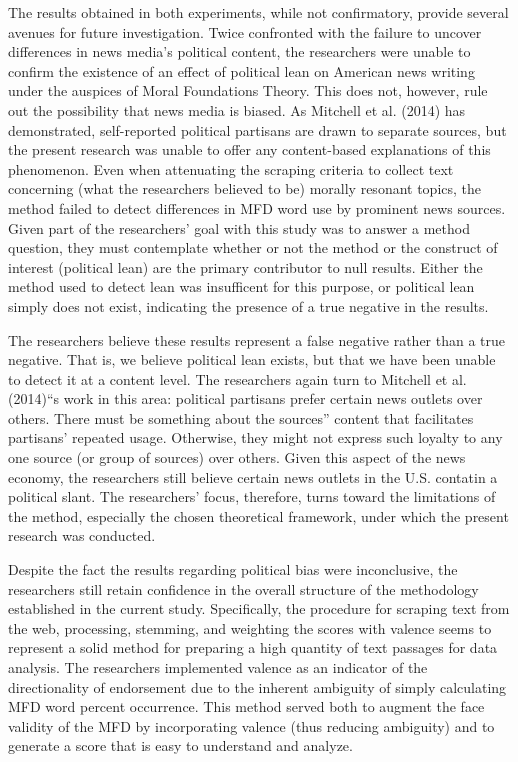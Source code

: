 \documentclass[english,,man]{apa6}
\begin{document}
The results obtained in both experiments, while not confirmatory,
provide several avenues for future investigation. Twice confronted with
the failure to uncover differences in news media's political content,
the researchers were unable to confirm the existence of an effect of
political lean on American news writing under the auspices of Moral
Foundations Theory. This does not, however, rule out the possibility
that news media is biased. As Mitchell et al. (2014) has demonstrated,
self-reported political partisans are drawn to separate sources, but the
present research was unable to offer any content-based explanations of
this phenomenon. Even when attenuating the scraping criteria to collect
text concerning (what the researchers believed to be) morally resonant
topics, the method failed to detect differences in MFD word use by
prominent news sources. Given part of the researchers' goal with this
study was to answer a method question, they must contemplate whether or
not the method or the construct of interest (political lean) are the
primary contributor to null results. Either the method used to detect
lean was insufficent for this purpose, or political lean simply does not
exist, indicating the presence of a true negative in the results.

The researchers believe these results represent a false negative rather
than a true negative. That is, we believe political lean exists, but
that we have been unable to detect it at a content level. The
researchers again turn to Mitchell et al. (2014)\enquote{s work in this
area: political partisans prefer certain news outlets over others. There
must be something about the sources} content that facilitates partisans'
repeated usage. Otherwise, they might not express such loyalty to any
one source (or group of sources) over others. Given this aspect of the
news economy, the researchers still believe certain news outlets in the
U.S. contatin a political slant. The researchers' focus, therefore,
turns toward the limitations of the method, especially the chosen
theoretical framework, under which the present research was conducted.

Despite the fact the results regarding political bias were inconclusive,
the researchers still retain confidence in the overall structure of the
methodology established in the current study. Specifically, the
procedure for scraping text from the web, processing, stemming, and
weighting the scores with valence seems to represent a solid method for
preparing a high quantity of text passages for data analysis. The
researchers implemented valence as an indicator of the directionality of
endorsement due to the inherent ambiguity of simply calculating MFD word
percent occurrence. This method served both to augment the face validity
of the MFD by incorporating valence (thus reducing ambiguity) and to
generate a score that is easy to understand and analyze.
\end{document}
